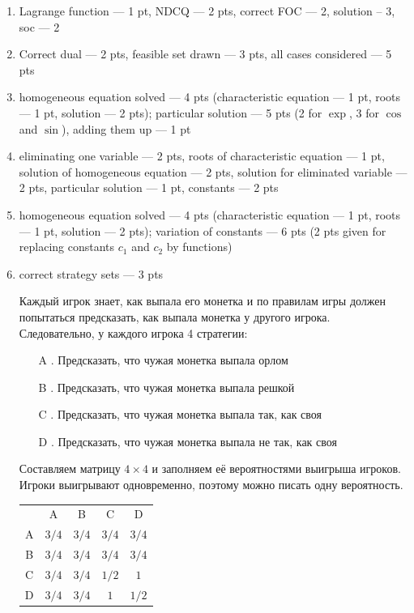 \documentclass[12pt]{article} %
\theoremstyle{definition} %
\begin{document}
\begin{enumerate}
\item Lagrange function --- 1 pt, NDCQ --- 2 pts, correct FOC --- 2, solution -- 3, soc --- 2

\item Correct dual --- 2 pts, feasible set drawn --- 3 pts, all cases considered --- 5 pts

\item homogeneous equation solved --- 4 pts (characteristic equation --- 1 pt, roots --- 1 pt, solution --- 2 pts); particular solution --- 5 pts (2 for $\exp$, 3 for $\cos$ and $\sin$), adding them up --- 1 pt


\item eliminating one variable --- 2 pts, roots of characteristic equation --- 1 pt, solution of homogeneous equation --- 2 pts, solution for eliminated variable --- 2 pts, particular solution --- 1 pt, constants --- 2 pts


\item  homogeneous equation solved --- 4 pts (characteristic equation --- 1 pt, roots --- 1 pt, solution --- 2 pts); variation of constants --- 6 pts (2 pts given for replacing constants $c_1$ and $c_2$ by functions)

\item  correct strategy sets --- 3 pts

Каждый игрок знает, как выпала его монетка и по правилам игры должен попытаться предсказать, как выпала монетка у другого игрока. Следовательно, у каждого игрока 4 стратегии:

\begin{enumerate}
\item[A]. Предсказать, что чужая монетка выпала орлом
\item[B]. Предсказать, что чужая монетка выпала решкой
\item[C]. Предсказать, что чужая монетка выпала так, как своя
\item[D]. Предсказать, что чужая монетка выпала не так, как своя
\end{enumerate}

Составляем матрицу $4\times 4$ и заполняем её вероятностями выигрыша игроков. Игроки выигрывают одновременно, поэтому можно писать одну вероятность.

\begin{tabular}{ccccc}
 & A & B & C & D \\
A & $3/4$ & $3/4$ & $3/4$ & $3/4$ \\
B & $3/4$ & $3/4$ & $3/4$ & $3/4$ \\
C & $3/4$ & $3/4$ & $1/2$ & $1$ \\
D & $3/4$ & $3/4$ & $1$ & $1/2$ \\
\end{tabular}



\end{enumerate}
\end{document}
